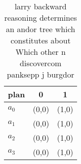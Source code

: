 \documentclass[a4paper]{article}
\begin{document}
\begin{table}
\begin{adjustbox}{width=0.8\columnwidth}
\begin{tabular}{|l|l|l|}
\hline
\textbf{plan} & \multicolumn{1}{c|}{\textbf{0}} & \multicolumn{1}{c|}{\textbf{1}} \\ \hline
\textbf{$a_0$}  & (0,0) & (1,0) \\ \hline
\textbf{$a_1$}  & (0,0) & (1,0) \\ \hline
\textbf{$a_2$}  & (0,0) & (1,0) \\ \hline
\textbf{$a_3$}  & (0,0) & (1,0) \\ \hline
\end{tabular}
\end{adjustbox}
\caption{ larry backward reasoning determines an andor tree which constitutes about Which other n discovercom panksepp j burgdor
}
\end{table}
\end{document}
